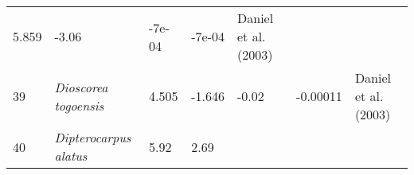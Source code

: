 \documentclass[]{article}
\begin{document}
\begin{longtable}[]{@{}lllllll@{}}
\begin{minipage}[t]{0.05\columnwidth}
5.859\strut
\end{minipage} & \begin{minipage}[t]{0.08\columnwidth}\raggedright
-3.06\strut
\end{minipage} & \begin{minipage}[t]{0.08\columnwidth}\raggedright
-7e-04\strut
\end{minipage} & \begin{minipage}[t]{0.08\columnwidth}\raggedright
-7e-04\strut
\end{minipage} & \begin{minipage}[t]{0.23\columnwidth}\raggedright
Daniel et al. (2003)\strut
\end{minipage}\tabularnewline
\begin{minipage}[t]{0.05\columnwidth}\raggedright
39\strut
\end{minipage} & \begin{minipage}[t]{0.23\columnwidth}\raggedright
\emph{Dioscorea togoensis}\strut
\end{minipage} & \begin{minipage}[t]{0.05\columnwidth}\raggedright
4.505\strut
\end{minipage} & \begin{minipage}[t]{0.08\columnwidth}\raggedright
-1.646\strut
\end{minipage} & \begin{minipage}[t]{0.08\columnwidth}\raggedright
-0.02\strut
\end{minipage} & \begin{minipage}[t]{0.08\columnwidth}\raggedright
-0.00011\strut
\end{minipage} & \begin{minipage}[t]{0.23\columnwidth}\raggedright
Daniel et al. (2003)\strut
\end{minipage}\tabularnewline
\begin{minipage}[t]{0.05\columnwidth}\raggedright
40\strut
\end{minipage} & \begin{minipage}[t]{0.23\columnwidth}\raggedright
\emph{Dipterocarpus alatus}\strut
\end{minipage} & \begin{minipage}[t]{0.05\columnwidth}\raggedright
5.92\strut
\end{minipage} & \begin{minipage}[t]{0.08\columnwidth}\raggedright
2.69\strut
\end{minipage} & \begin{minipage}[t]{0.08\columnwidth}\raggedright

\end{minipage}
\end{longtable}
\end{document}
